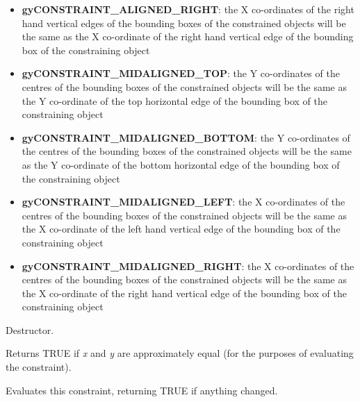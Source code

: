 {\begin{itemize}
of the bounding boxes of the constrained objects will be the same as
the X co-ordinate of the left hand vertical edge of the bounding box
of the constraining object
\item {\bf gyCONSTRAINT\_ALIGNED\_RIGHT}: the X co-ordinates of the right hand vertical edges
of the bounding boxes of the constrained objects will be the same as
the X co-ordinate of the right hand vertical edge of the bounding box
of the constraining object
\item {\bf gyCONSTRAINT\_MIDALIGNED\_TOP}: the Y co-ordinates of the centres of
the bounding boxes of the constrained objects will be the same
as the Y co-ordinate of the top horizontal edge of
the bounding box of the constraining object
\item {\bf gyCONSTRAINT\_MIDALIGNED\_BOTTOM}: the Y co-ordinates of the centres of
the bounding boxes of the constrained objects will be the same
as the Y co-ordinate of the bottom horizontal edge of
the bounding box of the constraining object
\item {\bf gyCONSTRAINT\_MIDALIGNED\_LEFT}: the X co-ordinates of the centres of
the bounding boxes of the constrained objects will be the same
as the X co-ordinate of the left hand vertical edge of
the bounding box of the constraining object
\item {\bf gyCONSTRAINT\_MIDALIGNED\_RIGHT}: the X co-ordinates of the centres of
the bounding boxes of the constrained objects will be the same as
the X co-ordinate of the right hand vertical edge of
the bounding box of the constraining object
\end{itemize}
}



Destructor.



Returns TRUE if {\it x} and {\it y} are approximately equal (for the purposes
of evaluating the constraint).



Evaluates this constraint, returning TRUE if anything changed.

\label{wxoglconstraintsetspacing}

